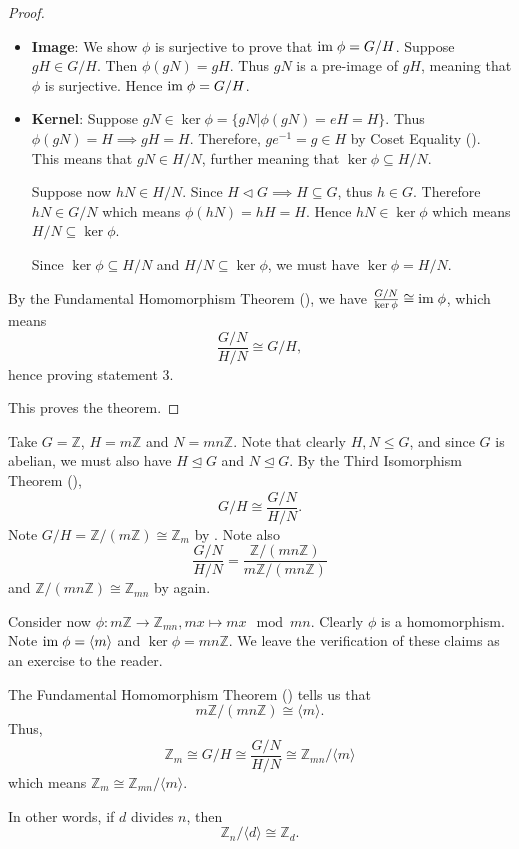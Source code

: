 \begin{proof}
\begin{enumerate}
\begin{itemize}
            \item \textbf{Image}: We show $\phi$ is surjective to prove that $\mathrm{im}\;\phi = G/H$. Suppose $gH \in G/H$. Then $\phi(gN) = gH$. Thus $gN$ is a pre-image of $gH$, meaning that $\phi$ is surjective. Hence $\mathrm{im}\;\phi = G/H$.
            
            \item \textbf{Kernel}: Suppose $gN \in \ker\phi = \{gN \vert \phi(gN) = eH = H\}$. Thus $\phi(gN) = H \implies gH = H$. Therefore, $ge^{-1} = g \in H$ by Coset Equality (). This means that $gN \in H/N$, further meaning that $\ker\phi \subseteq H/N$.

            Suppose now $hN \in H/N$. Since $H \lhd G \implies H\subseteq G$, thus $h \in G$. Therefore $hN \in G/N$ which means $\phi(hN) = hH = H$. Hence $hN \in \ker\phi$ which means $H/N \subseteq \ker\phi$.

            Since $\ker\phi \subseteq H/N$ and $H/N \subseteq \ker\phi$, we must have $\ker\phi = H/N$.
        \end{itemize}

        \newpage

        By the Fundamental Homomorphism Theorem (), we have $\frac{G/N}{\ker\phi} \cong \mathrm{im}\;\phi$, which means
        \[
            \frac{G/N}{H/N} \cong G/H,
        \]
        hence proving statement 3.
    \end{enumerate}
    This proves the theorem.
\end{proof}

\begin{example}
    Take $G = \mathbb{Z}$, $H = m\mathbb{Z}$ and $N = mn\mathbb{Z}$. Note that clearly $H, N \leq G$, and since $G$ is abelian, we must also have $H \unlhd G$ and $N \unlhd G$. By the Third Isomorphism Theorem (),
    \[
        G/H \cong \frac{G/N}{H/N}.
    \]
    Note $G/H = \mathbb{Z}/(m\mathbb{Z}) \cong \mathbb{Z}_m$ by . Note also
    \[
        \frac{G/N}{H/N} = \frac{\mathbb{Z}/(mn\mathbb{Z})}{m\mathbb{Z}/(mn\mathbb{Z})}
    \]
    and $\mathbb{Z}/(mn\mathbb{Z}) \cong \mathbb{Z}_{mn}$ by  again.

    Consider now $\phi: m\mathbb{Z} \to \mathbb{Z}_{mn}, mx \mapsto mx \mod mn$. Clearly $\phi$ is a homomorphism. Note $\mathrm{im}\; \phi = \langle m \rangle$ and $\ker \phi = mn\mathbb{Z}$. We leave the verification of these claims as an exercise to the reader.

    The Fundamental Homomorphism Theorem () tells us that
    \[
        m\mathbb{Z} / (mn\mathbb{Z}) \cong \langle m \rangle.
    \]
    Thus,
    \[
        \mathbb{Z}_m \cong G/H \cong \frac{G/N}{H/N} \cong \mathbb{Z}_{mn}/\langle m \rangle
    \]
    which means $\mathbb{Z}_m \cong \mathbb{Z}_{mn} / \langle m \rangle$.

    In other words, if $d$ divides $n$, then
    \[
        \mathbb{Z}_n / \langle d \rangle \cong \mathbb{Z}_d.
    \]
\end{example}

